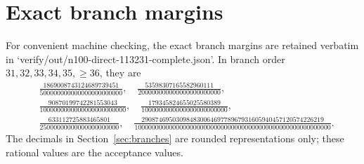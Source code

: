 \documentclass[11pt]{article}
\begin{document}
\section{Exact branch margins}
For convenient machine checking, the exact branch margins are retained verbatim in `verify/out/n100-direct-113231-complete.json'. In branch order $31,32,33,34,35,\geq36$, they are
\begin{align*}
&\frac{1869008743124689739451}{500000000000000000000000},\quad
\frac{53598307165582960111}{200000000000000000000000},\\
&\frac{90870199742281553043}{1000000000000000000000000},\quad
\frac{179345824655025580389}{1000000000000000000000000},\\
&\frac{633112725883465801}{25000000000000000000000},\quad
\frac{29087469503098483006469778967931605940457120574226219}{100000000000000000000000000000000000000000000000000000000}.
\end{align*}
The decimals in Section~\ref{sec:branches} are rounded representations only; these rational values are the acceptance values.
\end{document}
